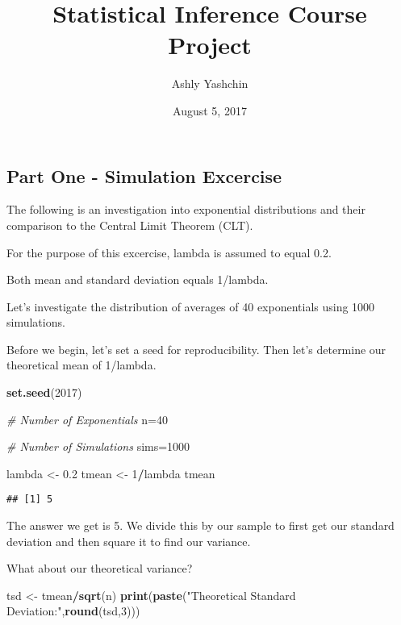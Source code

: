\documentclass[]{article}
\title{Statistical Inference Course Project}
\author{Ashly Yashchin}
\date{August 5, 2017}
\newenvironment{Shaded}{\begin{snugshade}}{\end{snugshade}}
\newcommand{\KeywordTok}[1]{\textcolor[rgb]{0.13,0.29,0.53}{\textbf{#1}}}
\newcommand{\DecValTok}[1]{\textcolor[rgb]{0.00,0.00,0.81}{#1}}
\newcommand{\FloatTok}[1]{\textcolor[rgb]{0.00,0.00,0.81}{#1}}
\newcommand{\StringTok}[1]{\textcolor[rgb]{0.31,0.60,0.02}{#1}}
\newcommand{\CommentTok}[1]{\textcolor[rgb]{0.56,0.35,0.01}{\textit{#1}}}
\newcommand{\OperatorTok}[1]{\textcolor[rgb]{0.81,0.36,0.00}{\textbf{#1}}}
\newcommand{\NormalTok}[1]{#1}
\begin{document}
\maketitle

\subsection{Part One - Simulation
Excercise}\label{part-one---simulation-excercise}

The following is an investigation into exponential distributions and
their comparison to the Central Limit Theorem (CLT).

For the purpose of this excercise, lambda is assumed to equal 0.2.

Both mean and standard deviation equals 1/lambda.

Let's investigate the distribution of averages of 40 exponentials using
1000 simulations.

Before we begin, let's set a seed for reproducibility. Then let's
determine our theoretical mean of 1/lambda.

\begin{Shaded}
\begin{Highlighting}[]
\KeywordTok{set.seed}\NormalTok{(}\DecValTok{2017}\NormalTok{)}

\CommentTok{# Number of Exponentials}
\NormalTok{n=}\DecValTok{40}

\CommentTok{# Number of Simulations}
\NormalTok{sims=}\DecValTok{1000}

\NormalTok{lambda <-}\StringTok{ }\FloatTok{0.2}
\NormalTok{tmean <-}\StringTok{ }\DecValTok{1}\OperatorTok{/}\NormalTok{lambda}
\NormalTok{tmean}
\end{Highlighting}
\end{Shaded}

\begin{verbatim}
## [1] 5
\end{verbatim}

The answer we get is 5. We divide this by our sample to first get our
standard deviation and then square it to find our variance.

What about our theoretical variance?

\begin{Shaded}
\begin{Highlighting}[]
\NormalTok{tsd <-}\StringTok{ }\NormalTok{tmean}\OperatorTok{/}\KeywordTok{sqrt}\NormalTok{(n)}
\KeywordTok{print}\NormalTok{(}\KeywordTok{paste}\NormalTok{(}\StringTok{"Theoretical Standard Deviation:"}\NormalTok{,}\KeywordTok{round}\NormalTok{(tsd,}\DecValTok{3}\NormalTok{)))}
\end{Highlighting}
\end{Shaded}
\end{document}

